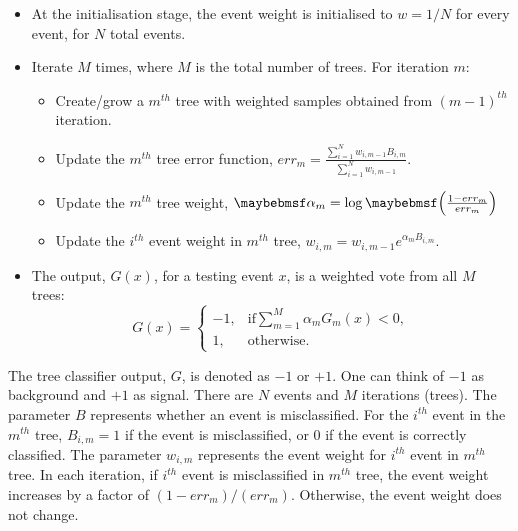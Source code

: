 \begin{itemize}
  \item At the initialisation stage, the event weight is initialised to $w = 1 / N$ for every event, for $N$ total events.
  \item Iterate $M$ times, where $M$ is the total number of trees. For iteration $m$:
    \begin{itemize}
      \item Create/grow a $m^{th}$ tree  with weighted samples obtained from $(m-1)^{th}$ iteration.
      \item Update the $m^{th}$ tree error function, $err_m = \frac{\sum_{i = 1}^{N} w_{i,m-1} B_{i,m} }{\sum_{i = 1}^{N}w_{i,m-1}}$.
      \item Update the $m^{th}$ tree weight,  $\alpha_m = \log\parenths{\frac{1 - err_m}{err_m}}$
      \item Update the $i^{th}$ event weight in $m^{th}$ tree, $w_{i,m} = w_{i,m-1} e^{\alpha_m B_{i,m} }$.
    \end{itemize}
  \item The output, $G(x)$, for a testing event $x$, is a weighted vote from all $M$ trees:
  \begin{equation}
    G(x)=
     \begin{cases}
      -1, & \mbox{if} \sum_{m=1}^{M}\alpha_mG_m(x) < 0 , \\
      1, & \mbox{otherwise}.
    \end{cases}
  \end{equation}
\end{itemize}
The tree classifier output, $G$, is denoted as  $-1$ or $+1$. One can think of $-1$ as background and $+1$ as signal. There are $N$ events and $M$ iterations (trees). The parameter $B$ represents whether an event is misclassified. For the $i^{th}$ event in the  $m^{th}$ tree,  $B_{i,m} = 1$ if the event is misclassified, or 0 if the event is correctly classified. The parameter $w_{i,m}$ represents the event weight for $i^{th}$ event  in $m^{th}$ tree. In each iteration, if $i^{th}$ event is misclassified in $m^{th}$ tree, the event weight increases by a factor of $(1 - err_m)/(err_m)$. Otherwise, the event weight does not change.

